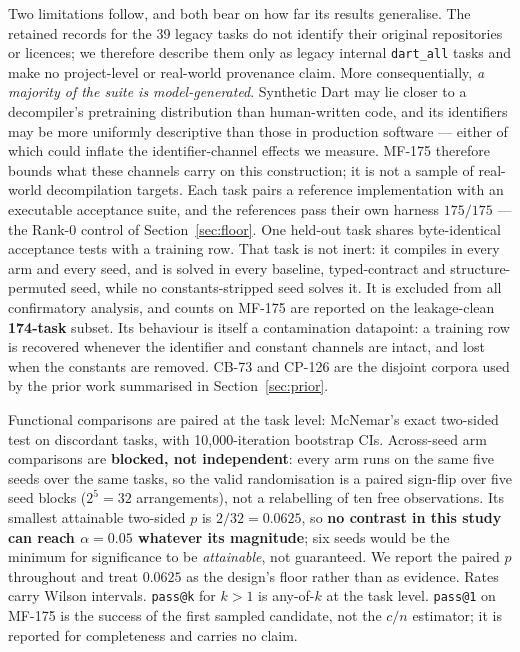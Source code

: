 \documentclass[conference]{IEEEtran}
\makeatletter
\newcommand{\passatk}{\texttt{pass@k}\xspace}
\newcommand{\passat}[1]{\texttt{pass@#1}\xspace}
\makeatother
\begin{document}
Two limitations follow, and both bear on how far its results generalise. The
retained records for the 39 legacy tasks do not identify their original
repositories or licences; we therefore describe them only as legacy internal
\texttt{dart\_all} tasks and make no project-level or real-world provenance
claim. More consequentially, \emph{a majority of the suite is model-generated}.
Synthetic Dart may lie closer to a decompiler's pretraining distribution than
human-written code, and its identifiers may be more uniformly descriptive than
those in production software --- either of which could inflate the
identifier-channel effects we measure. MF-175 therefore bounds what these
channels carry on this construction; it is not a sample of real-world
decompilation targets. Each task pairs a
reference implementation with an executable acceptance suite, and the references
pass their own harness $175/175$ --- the Rank-0 control of
Section~\ref{sec:floor}. One held-out task shares
byte-identical acceptance tests with a training row. That task is not inert: it compiles in every arm and every seed, and is solved
in every baseline, typed-contract and structure-permuted seed, while no
constants-stripped seed solves it. It is excluded from all confirmatory
analysis, and counts on MF-175 are reported on the leakage-clean
\textbf{174-task} subset. Its behaviour is itself a contamination datapoint: a
training row is recovered whenever the identifier and constant channels are
intact, and lost when the constants are removed. CB-73 and CP-126 are the
disjoint corpora used by the prior work summarised in Section~\ref{sec:prior}.

Functional comparisons are paired at the task level: McNemar's exact two-sided
test on discordant tasks, with 10{,}000-iteration bootstrap CIs. Across-seed arm
comparisons are \textbf{blocked, not independent}: every arm runs on the same
five seeds over the same tasks, so the valid randomisation is a paired sign-flip
over five seed blocks ($2^5=32$ arrangements), not a relabelling of ten free
observations. Its smallest attainable two-sided $p$ is $2/32=0.0625$, so
\textbf{no contrast in this study can reach $\alpha{=}0.05$ whatever its
magnitude}; six seeds would be the minimum for significance to be \emph{attainable}, not
guaranteed. We report the paired $p$ throughout
and treat $0.0625$ as the design's floor rather than as evidence. Rates carry Wilson intervals. \passatk for $k>1$ is
any-of-$k$ at the task level. \passat{1} on MF-175 is the success of the
first sampled candidate, not the $c/n$ estimator; it is reported for
completeness and carries no claim.
\end{document}
